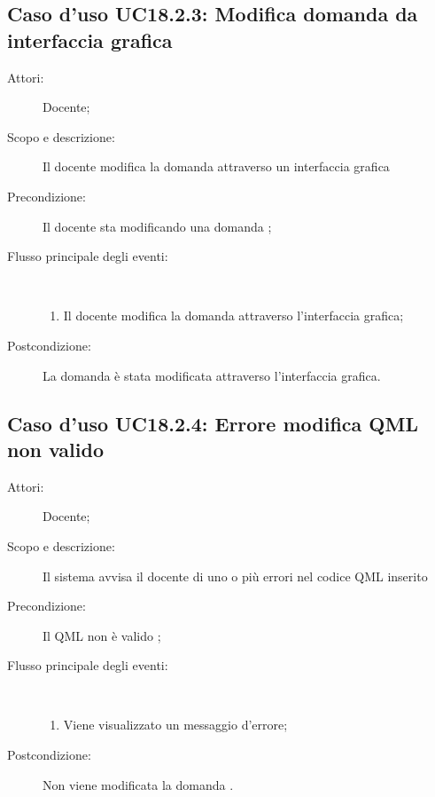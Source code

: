 \subsection{Caso d'uso UC18.2.3: Modifica domanda da interfaccia grafica}\begin{description}
	\item[Attori:] Docente;
	\item[Scopo e descrizione:] Il docente modifica la domanda attraverso un interfaccia grafica
	
	\item[Precondizione:] Il docente sta modificando una domanda
	;
	
	\item[Flusso principale degli eventi:] \ 
	\begin{enumerate}
		\item Il docente modifica la domanda attraverso l'interfaccia grafica;
		
	\end{enumerate}
	\item[Postcondizione:] La domanda è stata modificata attraverso l'interfaccia grafica.
\end{description}
\hypertarget{UC18.2.4}{}
\subsection{Caso d'uso UC18.2.4: Errore modifica QML non valido}\begin{description}
	\item[Attori:] Docente;
	\item[Scopo e descrizione:] Il sistema avvisa il docente di uno o più errori nel codice QML inserito
	
	\item[Precondizione:] Il QML non è valido
	;
	
	\item[Flusso principale degli eventi:] \ 
	\begin{enumerate}
		\item Viene visualizzato un messaggio d'errore;
		
	\end{enumerate}
	\item[Postcondizione:] Non viene modificata la domanda
	.
\end{description}
\hypertarget{UC18.2.5}{}
